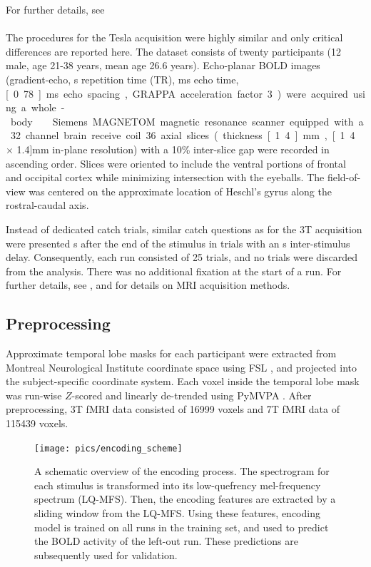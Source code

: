 For further details, see \citet{CTK+2012}

\paragraph{\sevenT}
%
The procedures for the \unit[7]{Tesla} acquisition were highly similar and only critical differences are reported here.
The dataset consists of twenty participants (12 male, age 21-38 years, mean age 26.6 years).
Echo-planar BOLD images (gradient-echo, \unit[2]{s} repetition time (TR), \unit[22]{ms} echo time, \unit[0.78]{ms} echo spacing, GRAPPA acceleration factor 3) were acquired using a whole-body \sevenT\ Siemens MAGNETOM magnetic resonance scanner equipped with a 32 channel brain receive coil. 36 axial slices (thickness \unit[1.4]{mm}, \unit[1.4 $\times$ 1.4]{mm} in-plane resolution) with a 10\% inter-slice gap were recorded in ascending order. Slices were oriented to include the ventral portions of frontal and occipital cortex while minimizing intersection with the eyeballs. The field-of-view was centered on the approximate location of Heschl's gyrus along the rostral-caudal axis.

Instead of dedicated catch trials, similar catch questions as for the 3T acquisition were presented \unit[4]{s} after the end of the stimulus in trials with an \unit[8]{s} inter-stimulus delay. Consequently, each run consisted of 25 trials, and no trials were discarded from the analysis.  There was no additional fixation at the start of a run. For further details, see \citet{HDH+2015}, and \citet{HBI+14} for details on MRI acquisition methods.

\subsection*{Preprocessing}

Approximate temporal lobe masks for each participant were extracted from Montreal Neurological Institute coordinate space using FSL \citep{SJB+04,JBB+12}, and projected into the subject-specific coordinate system.  Each voxel inside the temporal lobe mask was run-wise $Z$-scored and linearly de-trended using PyMVPA \citep{HHS09b}. After preprocessing, 3T f{MRI} data consisted of 16999 voxels and 7T f{MRI} data of 115439 voxels.

\begin{figure}[!htb]
  \centering
  \texttt{[image: pics/encoding\_scheme]}

  \caption{A schematic overview of the encoding process. The spectrogram for
    each stimulus is transformed into its low-quefrency mel-frequency spectrum
    (LQ-MFS). Then, the encoding features are extracted by a sliding window
    from the LQ-MFS. Using these features, encoding model is trained on all
    runs in the training set, and used to predict the BOLD activity of the
  left-out run.  These predictions are subsequently used for validation.}

 \label{fig:encoding_scheme}
\end{figure}

